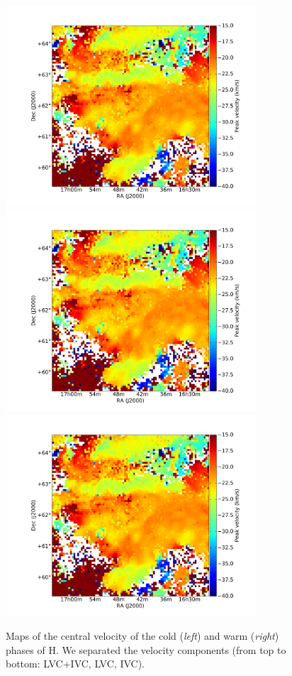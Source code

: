 \documentclass[traditabstract]{aa}
\begin{document}
\begin{figure}[h]
  \hspace{5mm}
  \includegraphics[page=5,height=7.5cm,trim=110 35 105 75,clip=true]{Figures/Phases_GHIGLS/GHIGLS_velo.pdf} \\
  \vspace{5mm}
  \includegraphics[page=3,height=7.5cm,trim=110 35 105 75,clip=true]{Figures/Phases_GHIGLS/GHIGLS_velo.pdf}
  \hspace{5mm}
  \includegraphics[page=6,height=7.5cm,trim=110 35 105 75,clip=true]{Figures/Phases_GHIGLS/GHIGLS_velo.pdf}
  \caption{Maps of the central velocity of the cold (\emph{left}) and warm (\emph{right}) phases of H. We separated the velocity components (from top to bottom: LVC+IVC, LVC, IVC).}
\end{figure}
\end{document}
